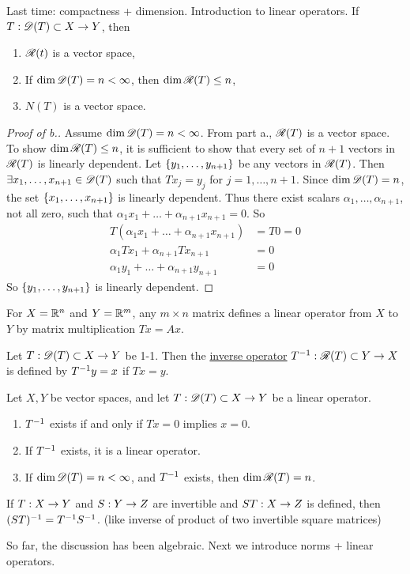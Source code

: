 \documentclass[]{article}
\begin{document}
\begin{recall}
Last time: compactness + dimension.
Introduction to linear operators.
If $T:\mathscr{D}(T)\subset X\rightarrow Y$, then
\begin{enumerate}
	\item[a.] $\mathscr{R}(t)$ is a vector space,
	\item[b.] If $\dim\mathscr{D}(T)=n<\infty$, then $\dim\mathscr{R}(T)\leq n$,
	\item[c.] $N(T)$ is a vector space.
\end{enumerate}
\end{recall}
\begin{proof}
	[Proof of b.]
	Assume $\dim\mathscr{D}(T)=n<\infty$.
	From part a., $\mathscr{R}(T)$ is a vector space.
	To show $\dim\mathscr{R}(T)\leq n$,
	it is sufficient to show that every set of $n+1$ vectors in $\mathscr{R}(T)$ is linearly dependent.
	Let $\left\{ y_1,\dots,y_{n+1} \right\}$ be any vectors in $\mathscr{R}(T)$.
	Then $\exists x_1,\dots,x_{n+1}\in\mathscr{D}(T)$ such that $Tx_j = y_j$ for $j=1,\dots,n+1$.
	Since $\dim\mathscr{D}(T) = n$, the set $\left\{ x_1,\dots,x_{n+1} \right\}$ is linearly dependent.
	Thus there exist scalars $\alpha_1,\dots,\alpha_{n+1}$, not all zero, such that $\alpha_1x_1+\dots+\alpha_{n+1}x_{n+1} = 0$.
	So 
	\begin{align*}
		T(\alpha_1x_1+\dots+\alpha_{n+1}x_{n+1}) &= T0 = 0 \\
		\alpha_1Tx_1 + \alpha_{n+1}Tx_{n+1} &= 0 \\
		\alpha_1y_1 + \dots + \alpha_{n+1}y_{n+1} &= 0
	\end{align*}
	So $\left\{ y_1,\dots,y_{n+1} \right\}$ is linearly dependent.
\end{proof}

\begin{example}
	For $X=\mathbb{R}^n$ and $Y=\mathbb{R}^m$, any $m\times n$ matrix defines a linear operator from $X$ to $Y$ by matrix multiplication $Tx=Ax$.
\end{example}
\begin{definition}
	Let $T:\mathscr{D}(T)\subset X\rightarrow Y$ be 1-1.
	Then the \ul{inverse operator} $T^{-1}:\mathscr{R}(T)\subset Y\rightarrow X$ is defined by $T^{-1} y=x$ if $Tx=y$.
\end{definition}
\begin{theorem}
	Let $X,Y$ be vector spaces, and let $T:\mathscr{D}(T)\subset X\rightarrow Y$ be a linear operator.
	\begin{enumerate}
		\item[a)] $T^{-1}$ exists if and only if $Tx=0$ implies $x=0$.
		\item[b)] If $T^{-1}$ exists, it is a linear operator.
		\item[c)] If $\dim\mathscr{D}(T)=n<\infty$, and $T^{-1}$ exists, then $\dim\mathscr{R}(T)=n$.
	\end{enumerate}
\end{theorem}
\begin{note}
	If $T:X\rightarrow Y$ and $S:Y\rightarrow Z$ are invertible and $ST:X\rightarrow Z$ is defined, then $(ST)^{-1} = T^{-1} S^{-1}$.
	(like inverse of product of two invertible square matrices)
\end{note}
So far, the discussion has been algebraic.
Next we introduce norms + linear operators.
\end{document}

